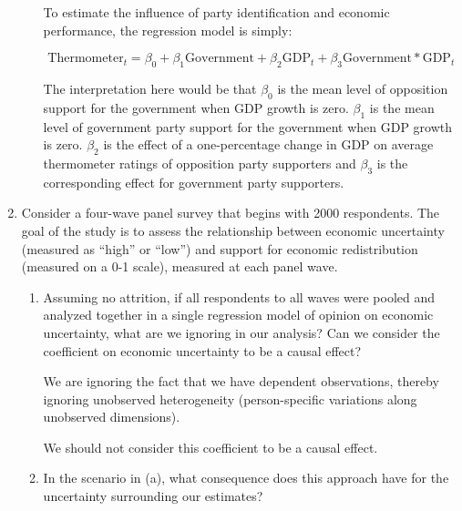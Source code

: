 \documentclass[a4paper]{exam}
\begin{document}
\begin{enumerate}
\begin{enumerate}
  \begin{solution}
  
  To estimate the influence of party identification and economic performance, the regression model is simply:
  
  \begin{equation}
  \text{Thermometer}_{t} = \beta_0 + \beta_1 \text{Government} + \beta_2 \text{GDP}_t + \beta_3 \text{Government} * \text{GDP}_t
  \end{equation}
  
  The interpretation here would be that $\beta_0$ is the mean level of opposition support for the government when GDP growth is zero. $\beta_1$ is the mean level of government party support for the government when GDP growth is zero. $\beta_2$ is the effect of a one-percentage change in GDP on average thermometer ratings of opposition party supporters and $\beta_3$ is the corresponding effect for government party supporters.
  
  \end{solution}
  
  \end{enumerate}

\item Consider a four-wave panel survey that begins with 2000 respondents. The goal of the study is to assess the relationship between economic uncertainty (measured as ``high'' or ``low'') and support for economic redistribution (measured on a 0-1 scale), measured at each panel wave.

  \begin{enumerate}
  \item Assuming no attrition, if all respondents to all waves were pooled and analyzed together in a single regression model of opinion on economic uncertainty, what are we ignoring in our analysis? Can we consider the coefficient on economic uncertainty to be a causal effect?
  
  \begin{solution}
  
  We are ignoring the fact that we have dependent observations, thereby ignoring unobserved heterogeneity (person-specific variations along unobserved dimensions).
  
  We should not consider this coefficient to be a causal effect.
  
  \end{solution}
  
  \item In the scenario in (a), what consequence does this approach have for the uncertainty surrounding our estimates?
  

\end{enumerate}
\end{enumerate}
\end{document}
